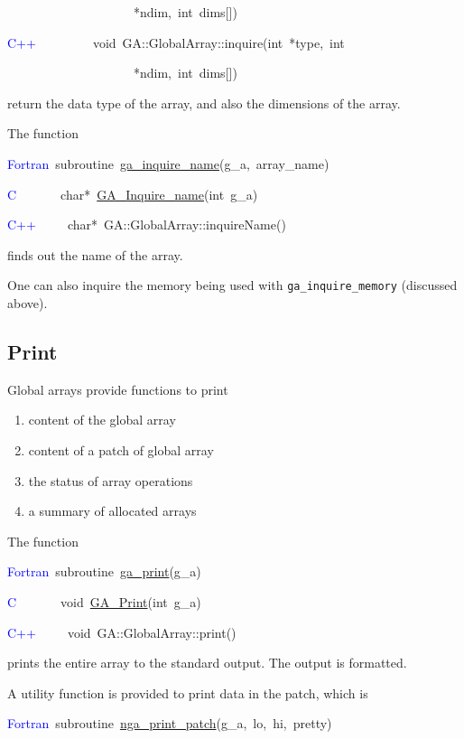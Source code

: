 ~~~~~~~~~~~~~~~~~~~~{*}ndim,~int~dims{[}{]})~

\textcolor{blue}{C++}~~~~~~~~~void~GA::GlobalArray::inquire(int~{*}type,~int~

~~~~~~~~~~~~~~~~~~~~{*}ndim,~int~dims{[}{]})

return the data type of the array, and also the dimensions of the
array.

The function

\textcolor{blue}{Fortran}~subroutine~\href{https://hpc.pnl.gov/globalarrays/api/f_op_api.html\#ga_inquire_name}{ga\_{}inquire\_{}name}(g\_a,~array\_name)~

\textcolor{blue}{C}~~~~~~~char{*}~\href{https://hpc.pnl.gov/globalarrays/api/c_op_api.html\#ga_inquire_name}{GA\_{}Inquire\_{}name}(int~g\_a)~~

\textcolor{blue}{C++}~~~~~char{*}~GA::GlobalArray::inquireName()

finds out the name of the array.

One can also inquire the memory being used with \texttt{ga\_inquire\_memory}
(discussed above). 


\subsection{Print }

Global arrays provide functions to print
\begin{enumerate}
\item content of the global array 
\item content of a patch of global array 
\item the status of array operations 
\item a summary of allocated arrays
\end{enumerate}
The function

\textcolor{blue}{Fortran}~subroutine~\href{https://hpc.pnl.gov/globalarrays/api/f_op_api.html\#ga_print}{ga\_{}print}(g\_a)~

\textcolor{blue}{C}~~~~~~~void~\href{https://hpc.pnl.gov/globalarrays/api/c_op_api.html\#ga_print}{GA\_{}Print}(int~g\_a)~

\textcolor{blue}{C++}~~~~~void~GA::GlobalArray::print()

prints the entire array to the standard output. The output is formatted.

A utility function is provided to print data in the patch, which is

\textcolor{blue}{Fortran}~subroutine~\href{https://hpc.pnl.gov/globalarrays/api/f_op_api.html\#ga_print_patch}{nga\_{}print\_{}patch}(g\_a,~lo,~hi,~pretty)~

